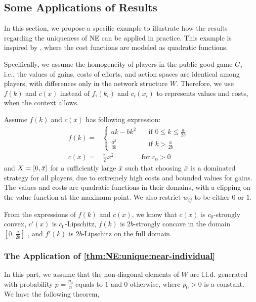 \subsection{Some Applications of Results}
\label{subsec:eg}

In this section, we propose a specific example to illustrate how the results regarding the uniqueness of NE can be applied in practice. This example is inspired by \citet{public-dynamic:fershtman1991dynamic}, where the cost functions are modeled as quadratic functions.

Specifically, we assume the homogeneity of players in the public good game $G$, i.e., the values of gains, costs of efforts, and action spaces are identical among players, with differences only in the network structure $W$. Therefore, we use $f(k)$ and $c(x)$ instead of $f_i(k_i)$ and $c_i(x_i)$ to represents values and costs, when the context allows. 

Assume $f(k)$ and $c(x)$ has following expression:
\begin{align*}
    f(k) =& 
    \begin{cases}
    ak - b k^2 \quad &\text{if $0\le k \le \frac{a}{2b}$}
    \\
    \frac{a^2}{4b} \quad &\text{if $k > \frac{a}{2b}$}
    \end{cases}
    \\
    c(x) =& \frac{c_0}{2}x^2\quad\qquad\quad \text{for $c_0>0$}
\end{align*}
and $X = [0,\bar{x}]$ for a sufficiently large 
$\bar{x}$ such that choosing $\bar{x}$ is a dominated strategy for all players, due to extremely high costs and bounded values for gains. 
The values and costs are quadratic functions in their domains, with a clipping on the value function at the maximum point.
We also restrict $w_{ij}$ to be either $0$ or $1$.



From the expressions of $f(k)$ and $c(x)$, we know that $c(x)$ is $c_0$-strongly convex, $c'(x)$ is $c_0$-Lipschitz, $f(k)$ is $2b$-strongly concave in the domain $[0,\frac{a}{2b}]$ , and $f'(k)$ is $2b$-Lipschitz on the full domain.

\subsubsection{The Application of \cref{thm:NE:unique:near-individual}}
In this part, we assume that the non-diagonal elements of $W$ are $\mathrm{i.i.d.}$ generated with probability $p = \frac{p_0}{n}$ equals to $1$ and $0$ otherwise, where $p_0>0$ is a constant.
We have the following theorem,



